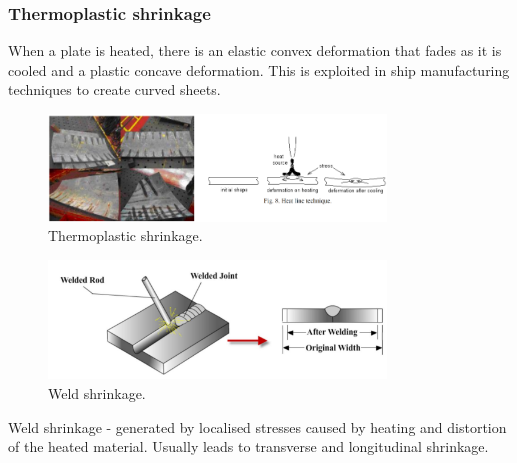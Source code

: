 \subsubsection{Thermoplastic shrinkage}
When a plate is heated, there is an elastic convex deformation that fades as it is cooled and a plastic concave deformation. This is exploited in ship manufacturing techniques to create curved sheets.
\begin{figure}[H]
    \centering
    \includegraphics[width = 0.8\textwidth]{img/figure49.png}
    \caption{Thermoplastic shrinkage.}
\end{figure}
\begin{figure}[H]
    \centering
    \includegraphics[width = 0.8\textwidth]{img/figure50.png}
    \caption{Weld shrinkage.}
\end{figure}
Weld shrinkage - generated by localised stresses caused by heating and distortion of the heated material. Usually leads to transverse and longitudinal shrinkage.
